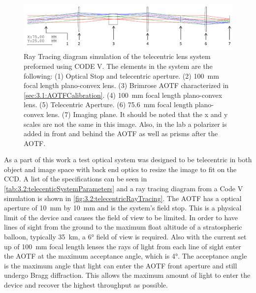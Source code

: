 \begin{figure}
    \includegraphics[width=1.0\textwidth]{./Images/3-2-TelecentricRayTracing.pdf}
    \caption[ALI Telecentric Design Prototype]{Ray Tracing diagram simulation of the telecentric lens system preformed using CODE V. The elements in the system are the following: (1) Optical Stop and telecentric aperture. (2) 100~mm focal length plano-convex lens. (3) Brimrose AOTF characterized in \autoref{sec:3.1:AOTFCalibration}. (4) 100~mm focal length plano-convex lens. (5) Telecentric Aperture. (6) 75.6~mm focal length plano-convex lens. (7) Imaging plane. It should be noted that the x and y scales are not the same in this image. Also, in the lab a polarizer is added in front and behind the AOTF as well as prisms after the AOTF.}
    \label{fig:3.2:telecentricRayTracing}
\end{figure}

As a part of this work a test optical system was designed to be telecentric in both object and image space with back end optics to resize the image to fit on the CCD. A list of the specifications can be seen in \autoref{tab:3.2:telecenticSystemParameters} and a ray tracing diagram from a Code V simulation is shown in \autoref{fig:3.2:telecentricRayTracing}. The AOTF has a optical aperture of 10~mm by 10~mm and is the system's field stop. This is a physical limit of the device and causes the field of view to be limited. In order to have lines of sight from the ground to the maximum float altitude of a stratospheric balloon, typically 35~km, a 6\si{\degree} field of view is required. Also with the current set up of 100~mm focal length lenses the rays of light from each line of sight enter the AOTF at the maximum acceptance angle, which is 4\si{\degree}. The acceptance angle is the maximum angle that light can enter the AOTF front aperture and still undergo Bragg diffraction. This allows the maximum amount of light to enter the device and recover the highest throughput as possible.


